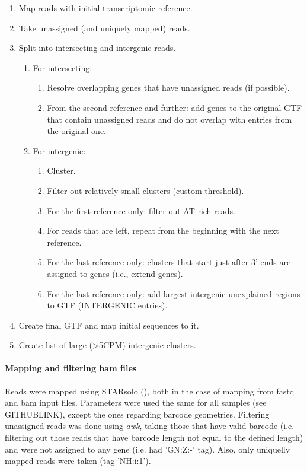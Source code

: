 \begin{enumerate}
    \item Map reads with initial transcriptomic reference.
    \item Take unassigned (and uniquely mapped) reads.
    \item Split into intersecting and intergenic reads.
    \begin{enumerate}
        \item For intersecting:
        \begin{enumerate}
            \item Resolve overlapping genes that have unassigned reads (if possible).
            \item From the second reference and further: add genes to the original GTF that contain unassigned reads
            and do not overlap with entries from the original one.
        \end{enumerate}
        \item For intergenic:
        \begin{enumerate}
            \item Cluster.
            \item Filter-out relatively small clusters (custom threshold).
            \item For the first reference only: filter-out AT-rich reads.
            \item For reads that are left, repeat from the beginning with the next reference.
            \item For the last reference only: clusters that start just after 3' ends are assigned to genes (i.e., extend genes).
            \item For the last reference only: add largest intergenic unexplained regions to GTF (INTERGENIC entries).
        \end{enumerate}
    \end{enumerate}
    \item Create final GTF and map initial sequences to it.
    \item Create list of large (\textgreater 5CPM) intergenic clusters.
\end{enumerate}

\paragraph{Mapping and filtering bam files}
Reads were mapped using STARsolo (\cite{Kaminow2021}), both in the case of mapping from fastq and bam input files.
Parameters were used the same for all samples (see GITHUBLINK), except the ones regarding barcode geometries.
Filtering unassigned reads was done using \textit{awk}, taking those that have valid barcode
(i.e. filtering out those reads that have barcode length not equal to the defined length)
and were not assigned to any gene (i.e. had 'GN:Z:-' tag).
Also, only uniquelly mapped reads were taken (tag 'NH:i:1').

